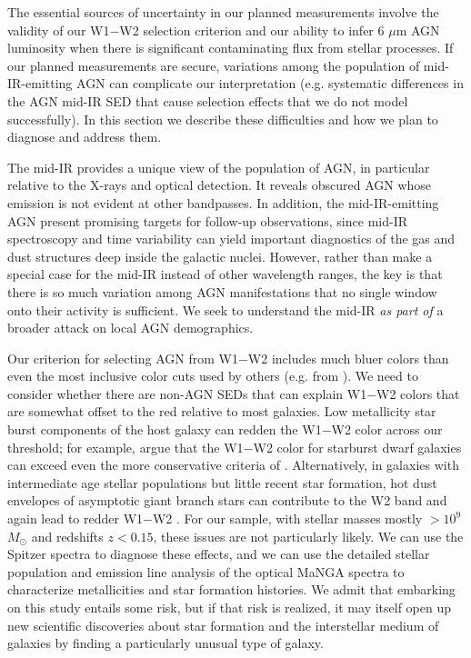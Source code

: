 \documentclass[12pt, preprint]{hacked-aastex}
\begin{document}
The essential sources of uncertainty in our planned measurements
involve the validity of our W1$-$W2 selection criterion and our
ability to infer 6 $\mu$m AGN luminosity when there is significant
contaminating flux from stellar processes. If our planned measurements
are secure, variations among the population of mid-IR-emitting AGN can
complicate our interpretation (e.g. systematic differences in the AGN
mid-IR SED that cause selection effects that we do not model
successfully). In this section we describe these difficulties and how
we plan to diagnose and address them.

 The mid-IR provides a unique
view of the population of AGN, in particular relative to the X-rays
and optical detection. It reveals obscured AGN whose emission is not
evident at other bandpasses. In addition, the mid-IR-emitting AGN
present promising targets for follow-up observations, since mid-IR
spectroscopy and time variability can yield important diagnostics of
the gas and dust structures deep inside the galactic nuclei. However,
rather than make a special case for the mid-IR instead of other
wavelength ranges, the key is that there is so much variation among
AGN manifestations that no single window onto their activity is
sufficient. We seek to understand the mid-IR {\it as part of} a
broader attack on local AGN demographics.

 Our criterion for
selecting AGN from W1$-$W2 includes much bluer colors than even the
most inclusive color cuts used by others (e.g. from \cite{assef18a}).
We need to consider whether there are non-AGN SEDs that can explain
W1$-$W2 colors that are somewhat offset to the red relative to most
galaxies.  Low metallicity star burst components of the host galaxy
can redden the W1$-$W2 color across our threshold; for example,
\cite{hainline16a} argue that the W1$-$W2 color for starburst dwarf
galaxies can exceed even the more conservative criteria of
\cite{stern12a}.  Alternatively, in galaxies with intermediate age
stellar populations but little recent star formation, hot dust
envelopes of asymptotic giant branch stars can contribute to the W2
band and again lead to redder W1$-$W2 \cite{villaume15a}. For our
sample, with stellar masses mostly $> 10^9$ $M_\odot$ and redshifts
$z<0.15$, these issues are not particularly likely. We can use the
Spitzer spectra to diagnose these effects, and we can use the detailed
stellar population and emission line analysis of the optical MaNGA
spectra to characterize metallicities and star formation histories.
We admit that embarking on this study entails some risk, but if that
risk is realized, it may itself open up new scientific discoveries
about star formation and the interstellar medium of galaxies by
finding a particularly unusual type of galaxy.
\end{document}
